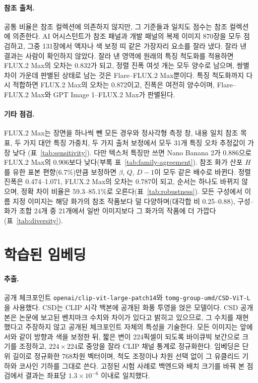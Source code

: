 \paragraph{참조 출처.} 공통 비율은 참조 컬렉션에 의존하지 않지만, 그 기준들과 일치도 점수는 참조
컬렉션에 의존한다. AI 어시스턴트가 참조 패널과 개발 패널의 복제 이미지 870장을 모두 점검하고, 그중
131장에서 액자나 색 보정 띠 같은 가장자리 요소를 잘라 냈다. 잘라 낸 결과는 사람이 확인하지 않았다.
잘라 낸 영역에 원래의 특징 척도화를 적용하면 FLUX.2 Max의 오차는 0.832가 되고, 정렬 진폭 여섯 개는
모두 양수로 남으며, 쌍별 차이 가운데 판별된 상태로 남는 것은 Flare--FLUX.2 Max뿐이다. 특징 척도화까지
다시 적합하면 FLUX.2 Max의 오차는 0.872이고, 진폭은 여전히 양수이며, Flare--FLUX.2 Max와 GPT Image
1--FLUX.2 Max가 판별된다.

\paragraph{기타 점검.} FLUX.2 Max는 장면을 하나씩 뺀 모든 경우와 정사각형 측정 창, 내용 일치 참조
목표, 두 가지 대안 특징 가중치, 두 가지 출처 보정에서 모두 31개 특징 오차 추정값이 가장 낮다
(표~\ref{tab:sensitivity}). 다만 텍스처 특징만 쓰면 Nano Banana 2가 0.886으로 FLUX.2 Max의 0.906보다
낮다(부록 표~\ref{tab:family-agreement}). 참조 화가 산포 $H$를 유한 표본 편향(6.7\%)만큼 보정하면
$\beta$, $Q$, $D-1$이 모두 같은 배수로 바뀐다. 정렬 진폭은 0.474--1.071, FLUX.2 Max의 오차는 0.787이
되고, 순서는 하나도 바뀌지 않으며, 정확 차이 비율은 59.3--85.1\%로 오른다(표~\ref{tab:robustness}).
모든 구성에서 이름 지정 이미지는 해당 화가의 참조 작품보다 덜 다양하며(대각합 비 0.25--0.88),
구성--화가 조합 24개 중 21개에서 일반 이미지보다 그 화가의 작품에 더 가깝다(표~\ref{tab:diversity}).

\FloatBarrier
\section{학습된 임베딩}\label{app:learned}

\paragraph{추출.} 공개 체크포인트
\texttt{openai/\allowbreak clip-\allowbreak vit-\allowbreak large-\allowbreak patch14}와
\texttt{tomg-\allowbreak group-\allowbreak umd/\allowbreak CSD-\allowbreak ViT-\allowbreak L}을 사용했다.
CSD는 CLIP 시각 백본에 공개된 화풍 투영을 얹은 모델이다. CSD 공개본은 논문에 보고된 벤치마크 수치와
차이가 있다고 밝히고 있으므로, 그 수치를 재현했다고 주장하지 않고 공개된 체크포인트 자체의 특성을
기술한다. 모든 이미지는 앞에서와 같이 방향과 색을 보정한 뒤, 짧은 변이 224픽셀이 되도록 바이큐빅
보간으로 크기를 조정하고, $224\times224$로 중앙을 잘라 CLIP 채널 통계로 정규화한다. 임베딩은 단위
길이로 정규화한 768차원 벡터이며, 척도 조정이나 차원 선택 없이 그 유클리드 기하와 코사인 기하를 그대로
쓴다. 고정된 시험 사례로 백엔드와 배치 크기를 바꿔 본 점검에서 결과는 좌표당 $1.3\times10^{-6}$
이내로 일치했다.

